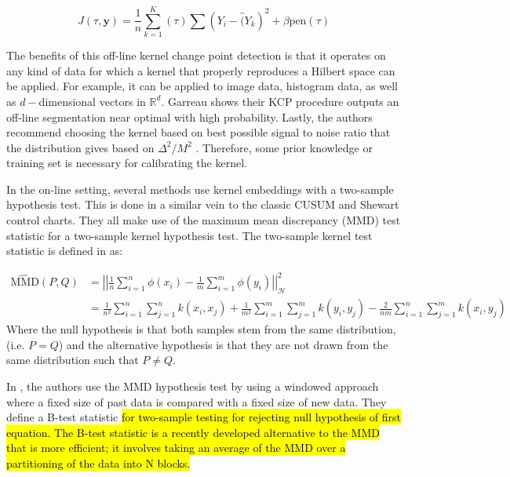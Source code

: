 \begin{equation}
J(\tau, \mathbf{y}) = \frac{1}{n} \sum_{k=1}^K(\tau) \sum (Y_i - \hat(Y_k)^2 + \beta \text{pen}(\tau)
\end{equation}


The benefits of this off-line kernel change point detection is that it operates on any kind of data for which a kernel that properly reproduces a Hilbert space can be applied. For example, it can be applied to image data, histogram data, as well as $d-$dimensional vectors in $\mathbb{R}^d$. Garreau shows their KCP procedure outputs an off-line segmentation near optimal with high probability. Lastly, the authors recommend choosing the kernel based on best possible signal to noise ratio that the distribution gives based on $ \Delta^2 / M^2$ . Therefore, some prior knowledge or training set is necessary for calibrating the kernel. 

In the on-line setting, several methods use kernel embeddings with a two-sample hypothesis test. This is done in a similar vein to the classic CUSUM and Shewart control charts. They all make use of the maximum mean discrepancy (MMD) test statistic for a two-sample kernel hypothesis test. The two-sample kernel test statistic  is defined in \cite{gretton2012kernel} as:

\begin{align*}
\widehat{\text{MMD}}(P,Q) &= \left| \left| \frac{1}{n}\sum_{i=1}^n \phi(x_i) - \frac{1}{m}\sum_{i=1}^m \phi(y_i) \right| \right|_{\mathcal{H}}^2 \\
&= \frac{1}{n^2} \sum_{i=1}^n\sum_{j=1}^n k(x_i, x_j) + \frac{1}{m^2} \sum_{i=1}^m\sum_{j=1}^m k(y_i, y_j) - \frac{2}{nm} \sum_{i=1}^n\sum_{j=1}^m k(x_i, y_j) 
\end{align*}
Where the null hypothesis is that both samples stem from the same distribution,  (i.e. $P = Q$) and the alternative hypothesis is that they are not drawn from the same distribution such that $P \neq Q$.

In  \cite{li2015m}, the authors use the MMD hypothesis test by using a windowed approach where a fixed size of past data is compared with a fixed size of new data. They define a B-test statistic \hl{for two-sample testing for rejecting null hypothesis of first equation. The B-test statistic is a recently developed alternative to the MMD that is more efficient; it involves taking an average of the MMD over a partitioning of the data into N blocks.}%

